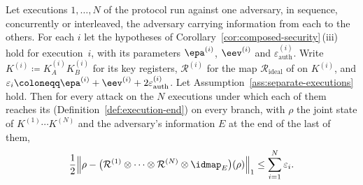 \begin{corollary}\label{cor:separate-executions}
Let executions $1,\dots,N$ of the protocol run against one adversary, in
sequence, concurrently or interleaved, the adversary carrying information
from each to the others. For each $i$ let the hypotheses of
Corollary~\ref{cor:composed-security}\,(iii) hold for execution~$i$, with
its parameters $\epa^{(i)}$, $\eev^{(i)}$ and
$\varepsilon_{\mathrm{auth}}^{(i)}$. Write
$K^{(i)}\coloneqq K_A^{(i)}K_B^{(i)}$ for its key registers,
$\mathcal R^{(i)}$ for the map $\mathcal R_{\mathrm{ideal}}$ of
\cite[Sec.~3.3, Eqs.~(13)--(17)]{tupkary2026decoy} on $K^{(i)}$, and
$\varepsilon_i\coloneqq\epa^{(i)}+\eev^{(i)}+2\varepsilon_{\mathrm{auth}}^{(i)}$.
Let Assumption~\ref{ass:separate-executions} hold. Then for every attack on
the $N$ executions under which each of them reaches its
 (Definition~\ref{def:execution-end}) on every
branch, with $\rho$ the joint state of $K^{(1)}\cdots K^{(N)}$ and the
adversary's information $E$ at the end of the last of them,
\begin{equation}\label{eq:separate-executions}
  \frac12\Big\|\rho-\big(\mathcal R^{(1)}\otimes\cdots\otimes
  \mathcal R^{(N)}\otimes\idmap_E\big)(\rho)\Big\|_1
  \le\sum_{i=1}^{N}\varepsilon_i .
\end{equation}
\end{corollary}

